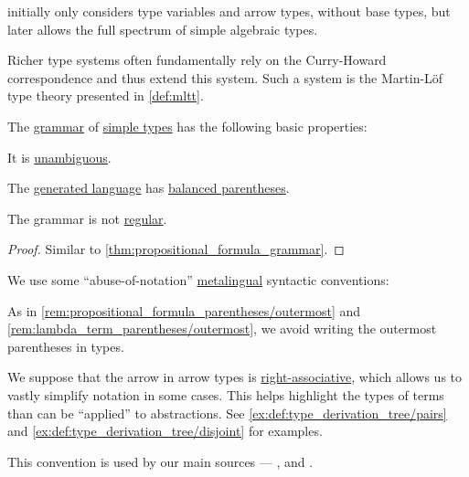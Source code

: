 \begin{concept}
\begin{thmenum}
     initially only considers type variables and arrow types, without base types, but later allows the full spectrum of simple algebraic types.

    Richer type systems often fundamentally rely on the Curry-Howard correspondence and thus extend this system. Such a system is the Martin-L\"of type theory presented in \cref{def:mltt}.
  \end{thmenum}
\end{concept}

\begin{proposition}\label{thm:simple_type_grammar}
  The \hyperref[def:formal_grammar]{grammar} of \hyperref[def:simple_type]{simple types} has the following basic properties:
  \begin{thmenum}
     It is \hyperref[def:grammar_ambiguity]{unambiguous}.

     The \hyperref[def:formal_grammar/language]{generated language} has \hyperref[def:paired_delimiters]{balanced parentheses}.

     The grammar is not \hyperref[def:chomsky_hierarchy/regular]{regular}.
  \end{thmenum}
\end{proposition}
\begin{proof}
  Similar to \cref{thm:propositional_formula_grammar}.
\end{proof}

\begin{remark}\label{rem:simple_type_parentheses}
  We use some \enquote{abuse-of-notation} \hyperref[con:metalogic]{metalingual} syntactic conventions:
  \begin{thmenum}
     As in \cref{rem:propositional_formula_parentheses/outermost} and \cref{rem:lambda_term_parentheses/outermost}, we avoid writing the outermost parentheses in types.

     We suppose that the arrow in arrow types is \hyperref[rem:binary_operation_syntax_trees/associativity]{right-associative}, which allows us to vastly simplify notation in some cases. This helps highlight the types of terms than can be \enquote{applied} to abstractions. See \cref{ex:def:type_derivation_tree/pairs} and \cref{ex:def:type_derivation_tree/disjoint} for examples.

    This convention is used by our main sources --- ,  and .
  \end{thmenum}
\end{remark}

